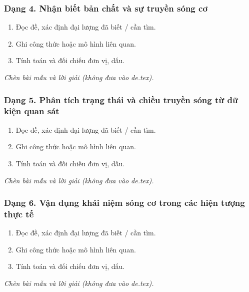 \subsubsection{Dạng 4. Nhận biết bản chất và sự truyền sóng cơ}
\begin{phuongphap}
\begin{enumerate}
\item Đọc đề, xác định đại lượng đã biết / cần tìm.
\item Ghi công thức hoặc mô hình liên quan.
\item Tính toán và đối chiếu đơn vị, dấu.
\end{enumerate}
\end{phuongphap}
\begin{vidumau}
\textit{Chèn bài mẫu và lời giải (không đưa vào de.tex).}
\end{vidumau}

\subsubsection{Dạng 5. Phân tích trạng thái và chiều truyền sóng từ dữ kiện quan sát}
\begin{phuongphap}
\begin{enumerate}
\item Đọc đề, xác định đại lượng đã biết / cần tìm.
\item Ghi công thức hoặc mô hình liên quan.
\item Tính toán và đối chiếu đơn vị, dấu.
\end{enumerate}
\end{phuongphap}
\begin{vidumau}
\textit{Chèn bài mẫu và lời giải (không đưa vào de.tex).}
\end{vidumau}

\subsubsection{Dạng 6. Vận dụng khái niệm sóng cơ trong các hiện tượng thực tế}
\begin{phuongphap}
\begin{enumerate}
\item Đọc đề, xác định đại lượng đã biết / cần tìm.
\item Ghi công thức hoặc mô hình liên quan.
\item Tính toán và đối chiếu đơn vị, dấu.
\end{enumerate}
\end{phuongphap}
\begin{vidumau}
\textit{Chèn bài mẫu và lời giải (không đưa vào de.tex).}
\end{vidumau}

